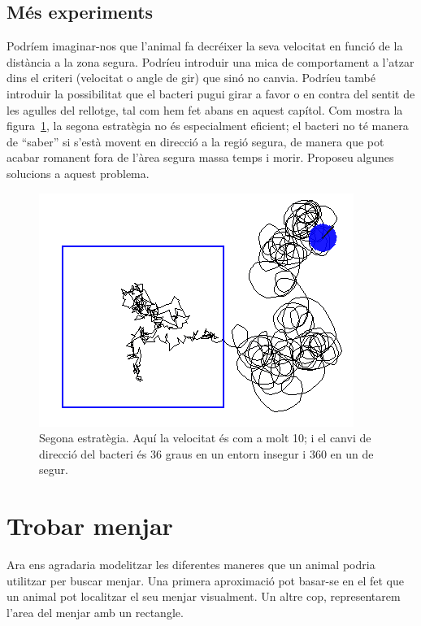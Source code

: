 \subsection{Més experiments}
Podríem imaginar-nos que l'animal fa decréixer la seva velocitat en funció de la distància a la zona segura. Podríeu introduir una mica de comportament a l'atzar dins el criteri (velocitat o angle de gir) que sinó no canvia. Podríeu també introduir la possibilitat que el bacteri pugui girar a favor o en contra del sentit de les agulles del rellotge, tal com hem fet abans en aquest capítol. Com mostra la figura~\ref{fig2310}, la segona estratègia no és especialment eficient; el bacteri no té manera de ``saber'' si s'està movent en direcció a la regió segura, de manera que pot acabar romanent fora de l'àrea segura massa temps i morir. Proposeu algunes solucions a aquest problema. 
\begin{figure}[h!]
\begin{center}
\includegraphics[scale=0.5]{Imatges/figura23-10}
\end{center}
\caption{Segona estratègia. Aquí la velocitat és com a molt 10; i el canvi de direcció del bacteri és 36 graus en un entorn insegur i 360 en un de segur.}
\label{fig2310}
\end{figure}

\section{Trobar menjar}
Ara ens agradaria modelitzar les diferentes maneres que un animal podria utilitzar per buscar menjar. Una primera aproximació pot basar-se en el fet que un animal pot localitzar el seu menjar visualment.
Un altre cop, representarem l'area del menjar amb un rectangle.

